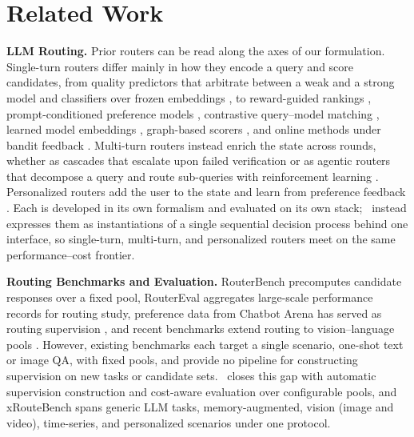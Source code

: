 \section{Related Work}
\label{sec:related}

\noindent\textbf{LLM Routing.}
Prior routers can be read along the axes of our formulation. Single-turn routers differ mainly in how they encode a query and score candidates, from quality predictors that arbitrate between a weak and a strong model \citep{ding2024hybrid, ong2024routellm} and classifiers over frozen embeddings \citep{shnitzer2023large, stripelis2024tensoropera, li2025rethinking}, to reward-guided rankings \citep{lu2024routing}, prompt-conditioned preference models \citep{frick2025prompt}, contrastive query--model matching \citep{chen2024routerdc}, learned model embeddings \citep{zhuang2025embedllm}, graph-based scorers \citep{feng2024graphrouter}, and online methods under bandit feedback \citep{dai2024cost, wang2025mixllm}. Multi-turn routers instead enrich the state across rounds, whether as cascades that escalate upon failed verification \citep{chen2023frugalgpt, aggarwal2024automix} or as agentic routers that decompose a query and route sub-queries with reinforcement learning \citep{zhang2025router, feng2026graphplanner}. Personalized routers add the user to the state and learn from preference feedback \citep{xie2025gmtrouter, dai2025personalizedrouter, yu2026tsrouter}. Each is developed in its own formalism and evaluated on its own stack; \method\ instead expresses them as instantiations of a single sequential decision process behind one interface, so single-turn, multi-turn, and personalized routers meet on the same performance--cost frontier.

\noindent\textbf{Routing Benchmarks and Evaluation.}
RouterBench \citep{hu2024routerbench} precomputes candidate responses over a fixed pool, RouterEval \citep{huang2025routereval} aggregates large-scale performance records for routing study, preference data from Chatbot Arena has served as routing supervision \citep{ong2024routellm}, and recent benchmarks extend routing to vision--language pools \citep{huang2025vl, ma2026mmr}. However, existing benchmarks each target a single scenario, one-shot text or image QA, with fixed pools, and provide no pipeline for constructing supervision on new tasks or candidate sets. \method\ closes this gap with automatic supervision construction and cost-aware evaluation over configurable pools, and xRouteBench spans generic LLM tasks, memory-augmented, vision (image and video), time-series, and personalized scenarios under one protocol.
